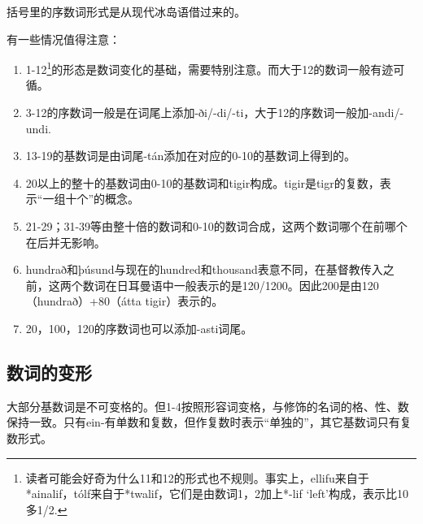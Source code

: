 {{括号里的序数词形式是从现代冰岛语借过来的。

有一些情况值得注意：

\begin{enumerate}
  \def\labelenumi{\arabic{enumi})}
  \item
        1-12\footnote{读者可能会好奇为什么11和12的形式也不规则。事实上，ellifu来自于*ainalif，tólf来自于*twalif，它们是由数词1，2加上*-lif
          `left'构成，表示比10多1/2.}的形态是数词变化的基础，需要特别注意。而大于12的数词一般有迹可循。
  \item
        3-12的序数词一般是在词尾上添加-ði/-di/-ti，大于12的序数词一般加-andi/-undi.
  \item
        13-19的基数词是由词尾-tán添加在对应的0-10的基数词上得到的。
  \item
        20以上的整十的基数词由0-10的基数词和tigir构成。tigir是tigr的复数，表示``一组十个''的概念。
  \item
        21-29；31-39等由整十倍的数词和0-10的数词合成，这两个数词哪个在前哪个在后并无影响。
  \item
        hundrað和þúsund与现在的hundred和thousand表意不同，在基督教传入之前，这两个数词在日耳曼语中一般表示的是120/1200。因此200是由120（hundrað）+80（átta
        tigir）表示的。
  \item
        20，100，120的序数词也可以添加-asti词尾。
\end{enumerate}

\subsection{数词的变形}\label{数词的变形}

大部分基数词是不可变格的。但1-4按照形容词变格，与修饰的名词的格、性、数保持一致。只有ein-有单数和复数，但作复数时表示``单独的''，其它基数词只有复数形式。

}}
